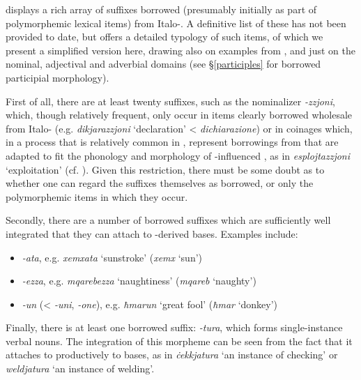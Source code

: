 \documentclass[output=paper]{langsci/langscibook}
\begin{document}
 displays a rich array of  suffixes borrowed (presumably initially as part of polymorphemic lexical items) from Italo-. A definitive list of these has not been provided to date, but \cite{Saade2019} offers a detailed typology of such items, of which we present a simplified version here, drawing also on examples from \cite{brincatmifsud2015}, and  just on the nominal, adjectival and adverbial domains (see §\ref{participles} for borrowed participial morphology).


First of all, there are at least twenty suffixes, such as the nominalizer \textit{-zzjoni}, which, though relatively frequent, only occur in items clearly borrowed wholesale from Italo- (e.g. \textit{dikjarazzjoni} `declaration' <  \textit{dichiarazione}) or in coinages which, in a process that is relatively common in , represent borrowings from  that are adapted to fit the phonology and morphology of -influenced , as in \textit{esplojtazzjoni} `exploitation' (cf. \citealt{gattfabri2018}). Given this restriction, there must be some doubt as to whether one can regard the suffixes themselves as borrowed, or only the polymorphemic items in which they occur.

Secondly, there are a number of borrowed suffixes which are sufficiently well integrated that they can attach to -derived bases. Examples include:

\begin{itemize}[noitemsep]
	\item[] \textit{-ata}, e.g. \textit{xemxata} `sunstroke' (\textit{xemx} `sun')

    \item[] \textit{-ezza}, e.g. \textit{mqarebezza} `naughtiness' (\textit{mqareb} `naughty')

    \item[] \textit{-un} (<  \textit{-uni},  \textit{-one}), e.g. \textit{ħmarun} `great fool' (\textit{ħmar} `donkey')
\end{itemize}

Finally, there is at least one borrowed suffix: \textit{-tura}, which forms single-instance verbal nouns. The integration of this morpheme can be seen from the fact that it attaches to productively to  bases, as in \textit{ċekkjatura} `an instance of checking' or \textit{weldjatura} `an instance of welding'.
\end{document}
